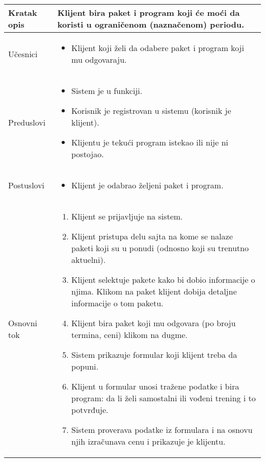 \documentclass[../main.tex]{subfiles}
\begin{document}
\begin{longtable}{| p{} | p{} |} 

\hline
    Kratak opis & Klijent bira paket i program koji će moći da koristi u ograničenom (naznačenom) periodu. \\ 
\hline    
    Učesnici & 
    	\begin{itemize}
        \item Klijent koji želi da odabere paket i program koji mu odgovaraju.
     \end{itemize}\\
\hline
   Preduslovi & \begin{itemize}
       \item Sistem je u funkciji.
       \item Korisnik je registrovan u sistemu (korisnik je klijent).
       \item Klijentu je tekući program istekao ili nije ni postojao.
   \end{itemize}\\
\hline  
    Postuslovi & \begin{itemize}
        \item Klijent je odabrao željeni paket i program.
    \end{itemize}\\
\hline
    Osnovni tok & \begin{enumerate}
        \item Klijent se prijavljuje na sistem.
        \item Klijent pristupa delu sajta na kome se nalaze paketi koji su u ponudi (odnosno koji su trenutno aktuelni).
        \item Klijent selektuje pakete kako bi dobio informacije o njima. Klikom na paket klijent dobija detaljne informacije o tom paketu.
        \item Klijent bira paket koji mu odgovara (po broju termina, ceni) klikom na dugme.
        \item Sistem prikazuje formular koji klijent treba da popuni.
        \item Klijent u formular unosi tražene podatke i bira program: da li želi samostalni ili vođeni trening i to potvrđuje.
        \item Sistem proverava podatke iz formulara i na osnovu njih izračunava cenu i prikazuje je klijentu.

\end{enumerate}
\end{longtable}
\end{document}
